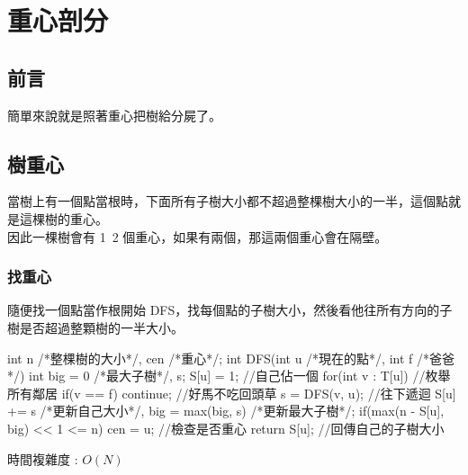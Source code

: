 \chapter{重心剖分}
    \section{前言}
    簡單來說就是照著重心把樹給分屍了。\\
    \section{樹重心}
    當樹上有一個點當根時，下面所有子樹大小都不超過整棵樹大小的一半，這個點就是這棵樹的重心。\\
    因此一棵樹會有 1~2 個重心，如果有兩個，那這兩個重心會在隔壁。\\
        \subsection{找重心}
        隨便找一個點當作根開始 DFS，找每個點的子樹大小，然後看他往所有方向的子樹是否超過整顆樹的一半大小。\\
        \begin{C++}
        int n /*整棵樹的大小*/, cen /*重心*/;
        int DFS(int u /*現在的點*/, int f /*爸爸*/){
            int big = 0 /*最大子樹*/, s;
            S[u] = 1; //自己佔一個
            for(int v : T[u]){ //枚舉所有鄰居
                if(v == f) continue; //好馬不吃回頭草
                s = DFS(v, u); //往下遞迴
                S[u] += s /*更新自己大小*/, big = max(big, s) /*更新最大子樹*/;
            }
            if(max(n - S[u], big) << 1 <= n) cen = u; //檢查是否重心
            return S[u]; //回傳自己的子樹大小
        }
        \end{C++}
        時間複雜度 : $O(N)$
